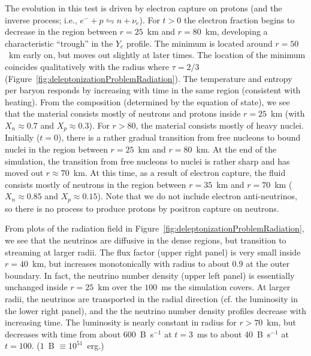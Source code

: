 \documentclass[11pt,letterpaper,twoside,english,final]{article}
\begin{document}
The evolution in this test is driven by electron capture on protons (and the inverse process; i.e., $e^{-}+p\leftrightharpoons n+\nu_{e}$).  
For $t>0$ the electron fraction begins to decrease in the region between $r=25$~km and $r=80$~km, developing a characteristic ``trough'' in the $Y_{e}$ profile.  
The minimum is located around $r=50$~km early on, but moves out slightly at later times.  
The location of the minimum coincides qualitatively with the radius where $\tau=2/3$ (Figure~\ref{fig:deleptonizationProblemRadiation}).  
The temperature and entropy per baryon responds by increasing with time in the same region (consistent with heating).  
From the composition (determined by the equation of state), we see that the material consists mostly of neutrons and protons inside $r=25$~km (with $X_{n}\approx0.7$ and $X_{p}\approx0.3$).  
For $r>80$, the material consists mostly of heavy nuclei.  
Initially ($t=0$), there is a rather gradual transition from free nucleons to bound nuclei in the region between $r=25$~km and $r=80$~km.  
At the end of the simulation, the transition from free nucleons to nuclei is rather sharp and has moved out $r\approx70$~km.  
At this time, as a result of electron capture, the fluid consists mostly of neutrons in the region between $r=35$~km and $r=70$~km ($X_{n}\approx0.85$ and $X_{p}\approx0.15$).  
Note that we do not include electron anti-neutrinos, so there is no process to produce protons by positron capture on neutrons.  

From plots of the radiation field in Figure~\ref{fig:deleptonizationProblemRadiation}, we see that the neutrinos are diffusive in the dense regions, but transition to streaming at larger radii.  
The flux factor (upper right panel) is very small inside $r=40$~km, but increases monotonically with radius to about $0.9$ at the outer boundary.  
In fact, the neutrino number density (upper left panel) is essentially unchanged inside $r=25$~km over the $100$~ms the simulation covers.  
At larger radii, the neutrinos are transported in the radial direction (cf. the luminosity in the lower right panel), and the the neutrino number density profiles decrease with increasing time.  
The luminosity is nearly constant in radius for $r>70$~km, but decreases with time from about 600~B~s$^{-1}$ at $t=3$~ms to about 40~B~s$^{-1}$ at $t=100$.  
($1$~B $\equiv10^{51}$~erg.)
\end{document}

